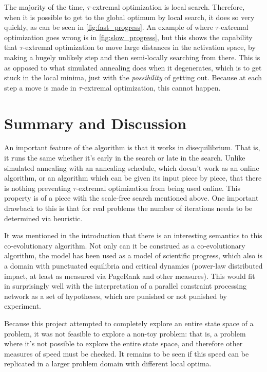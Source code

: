 \documentclass[12pt]{article}
\begin{document}
The majority of the time, $\tau$-extremal optimization is local search. Therefore, when it is possible to get to the global optimum by local search, it does so very quickly, as can be seen in \ref{fig:fast_progress}. An example of where $\tau$-extremal optimization goes wrong is in \ref{fig:slow_progress}, but this shows the capability that $\tau$-extremal optimization to move large distances in the activation space, by making a hugely unlikely step and then semi-locally searching from there. This is as opposed to what simulated annealing does when it degenerates, which is to get stuck in the local minima, just with the \emph{possibility} of getting out. Because at each step a move is made in $\tau$-extremal optimization, this cannot happen.

\section{Summary and Discussion}
An important feature of the algorithm is that it works in disequilibrium. That is, it runs the same whether it's early in the search or late in the search. Unlike simulated annealing with an annealing schedule, which doesn't work as an online algorithm, or an algorithm which can be given its input piece by piece, that there is nothing preventing $\tau$-extremal optimization from being used online. This property is of a piece with the scale-free search mentioned above. One important drawback to this is that for real problems the number of iterations needs to be determined via heuristic.

It was mentioned in the introduction that there is an interesting semantics to this co-evolutionary algorithm. Not only can it be construed as a co-evolutionary algorithm, the model has been used as a model of scientific progress, which also is a domain with punctuated equilibria and critical dynamics (power-law distributed impact, at least as measured via PageRank and other measures). This would fit in surprisingly well with the interpretation of a parallel constraint processing network as a set of hypotheses, which are punished or not punished by experiment.

Because this project attempted to completely explore an entire state space of a problem, it was not feasible to explore a non-toy problem: that is, a problem where it's not possible to explore the entire state space, and therefore other measures of speed must be checked. It remains to be seen if this speed can be replicated in a larger problem domain with different local optima.
\end{document}
